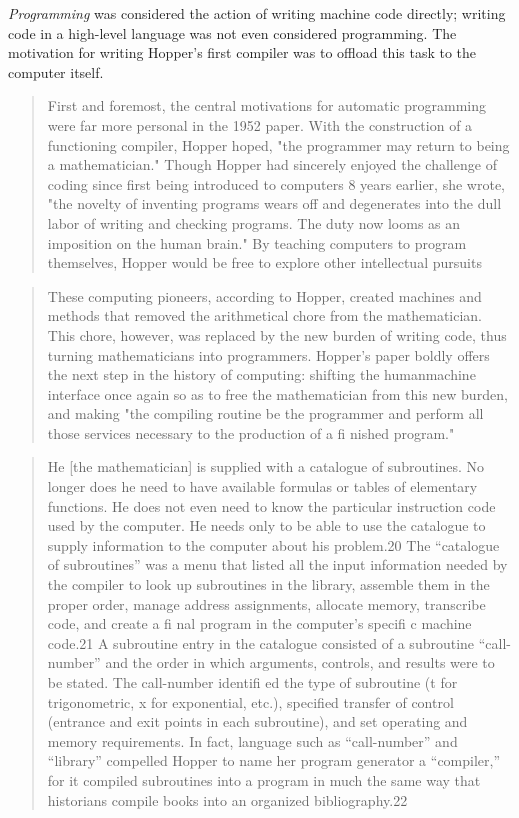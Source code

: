 \textit{Programming} was considered the action of writing machine code directly;
writing code in a high-level language was not even considered programming.
The motivation for writing Hopper's first compiler was to offload this task
to the computer itself.

\begin{quotation}
First and
foremost, the central motivations for automatic programming
were far more personal in the 1952 paper. With the construction
of a functioning compiler, Hopper hoped, "the programmer
may return to being a mathematician." Though Hopper had
sincerely enjoyed the challenge of coding since first being introduced to computers 8 years earlier, she wrote, "the novelty of
inventing programs wears off and degenerates into the dull labor
of writing and checking programs. The duty now looms as an
imposition on the human brain." By teaching computers to
program themselves, Hopper would be free to explore other
intellectual pursuits 
\end{quotation}

\begin{quotation}
These computing pioneers, according to
Hopper, created machines and methods that removed the arithmetical chore from the mathematician. This chore, however, was
replaced by the new burden of writing code, thus turning mathematicians into programmers. Hopper's paper boldly offers the
next step in the history of computing: shifting the humanmachine interface once again so as to free the mathematician
from this new burden, and making "the compiling routine be
the programmer and perform all those services necessary to the
production of a fi nished program."
\end{quotation}

\begin{quotation}
He [the mathematician] is supplied with a catalogue of subroutines. No
longer does he need to have available formulas or tables of elementary
functions. He does not even need to know the particular instruction
code used by the computer. He needs only to be able to use the catalogue to supply information to the computer about his problem.20
The “catalogue of subroutines” was a menu that listed all the
input information needed by the compiler to look up subroutines in the library, assemble them in the proper order, manage
address assignments, allocate memory, transcribe code, and create
a fi nal program in the computer’s specifi c machine code.21 A
subroutine entry in the catalogue consisted of a subroutine
“call-number” and the order in which arguments, controls, and
results were to be stated. The call-number identifi ed the type of
subroutine (t for trigonometric, x for exponential, etc.), specified
transfer of control (entrance and exit points in each subroutine),
and set operating and memory requirements. In fact, language
such as “call-number” and “library” compelled Hopper to name
her program generator a “compiler,” for it compiled subroutines
into a program in much the same way that historians compile
books into an organized bibliography.22
\end{quotation}

